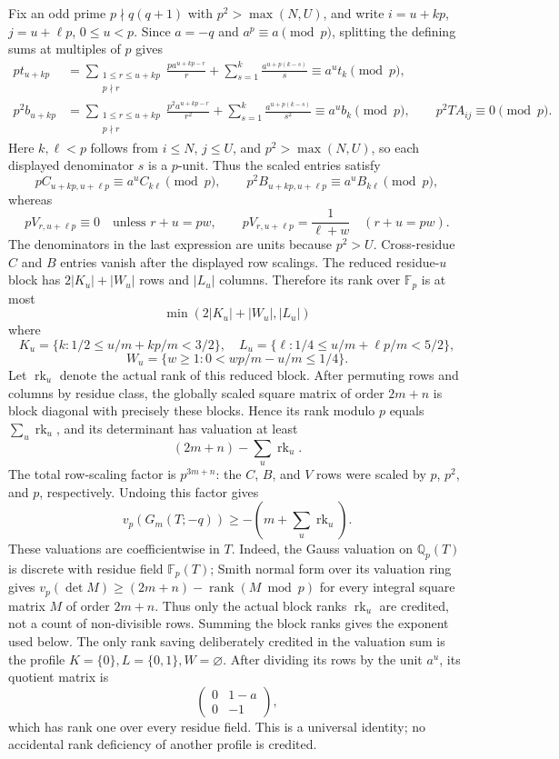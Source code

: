 Fix an odd prime \(p\nmid q(q+1)\) with \(p^2>\max(N,U)\), and write
\(i=u+kp\), \(j=u+\ell p\), \(0\le u<p\).  Since \(a=-q\) and
\(a^p\equiv a\pmod p\), splitting the defining sums at multiples of \(p\)
gives
\begin{align*}
 p t_{u+kp}
 &=\sum_{\substack{1\le r\le u+kp\\p\nmid r}}
       \frac{p a^{u+kp-r}}r
   +\sum_{s=1}^{k}\frac{a^{u+p(k-s)}}s
   \equiv a^u t_k\pmod p,\\
 p^2 b_{u+kp}
 &=\sum_{\substack{1\le r\le u+kp\\p\nmid r}}
       \frac{p^2a^{u+kp-r}}{r^2}
   +\sum_{s=1}^{k}\frac{a^{u+p(k-s)}}{s^2}
   \equiv a^u b_k\pmod p,\qquad
 p^2TA_{ij}\equiv0\pmod p.
\end{align*}
Here \(k,\ell<p\) follows from \(i\le N\), \(j\le U\), and
\(p^2>\max(N,U)\), so each displayed denominator \(s\) is a \(p\)-unit.
Thus the scaled entries satisfy
\[
 pC_{u+kp,u+\ell p}\equiv a^uC_{k\ell}\pmod p,\qquad
 p^2B_{u+kp,u+\ell p}\equiv a^uB_{k\ell}\pmod p,
\]
whereas
\[
 pV_{r,u+\ell p}\equiv0\quad\text{unless }r+u=pw,\qquad
 pV_{r,u+\ell p}=\frac1{\ell+w}\quad(r+u=pw).
\]
The denominators in the last expression are units because \(p^2>U\).
Cross-residue \(C\) and \(B\) entries vanish after the displayed row
scalings.  The reduced residue-\(u\) block has \(2|K_u|+|W_u|\) rows and
\(|L_u|\) columns.  Therefore its rank over \(\mathbb F_p\) is at most
\[
 \min(2|K_u|+|W_u|,|L_u|)
\]
where
\[
 K_u=\{k:1/2\le u/m+kp/m<3/2\},\quad
 L_u=\{\ell:1/4\le u/m+\ell p/m<5/2\},
\]
\[
W_u=\{w\ge1:0<w p/m-u/m\le1/4\}.
\]
Let $\operatorname{rk}_u$ denote the actual rank of this reduced block.
After permuting rows and columns by residue class, the globally scaled square
matrix of order $2m+n$ is block diagonal with precisely these blocks.  Hence
its rank modulo $p$ equals $\sum_u\operatorname{rk}_u$, and its determinant
has valuation at least
\[
 (2m+n)-\sum_u\operatorname{rk}_u.
\]
The total row-scaling factor is $p^{3m+n}$: the $C$, $B$, and $V$ rows were
scaled by $p$, $p^2$, and $p$, respectively.  Undoing this factor gives
\[
 v_p(G_m(T;-q))\ge -\left(m+\sum_u\operatorname{rk}_u\right).
\]
These valuations are coefficientwise in $T$.  Indeed, the Gauss valuation on
$\mathbb Q_p(T)$ is discrete with residue field $\mathbb F_p(T)$; Smith
normal form over its valuation ring gives
$v_p(\det M)\ge (2m+n)-\operatorname{rank}(M\bmod p)$ for every integral
square matrix $M$ of order $2m+n$.  Thus only the actual block ranks
$\operatorname{rk}_u$ are credited,
not a count of non-divisible rows.  Summing the block ranks gives the
exponent used below.
The only rank saving deliberately credited in the valuation sum is the profile
\(K=\{0\},L=\{0,1\},W=\varnothing\).  After dividing its rows by the
unit \(a^u\), its quotient matrix is
\[
 \begin{pmatrix}0&1-a\\0&-1\end{pmatrix},
\]
which has rank one over every residue field.  This is a universal identity;
no accidental rank deficiency of another profile is credited.

